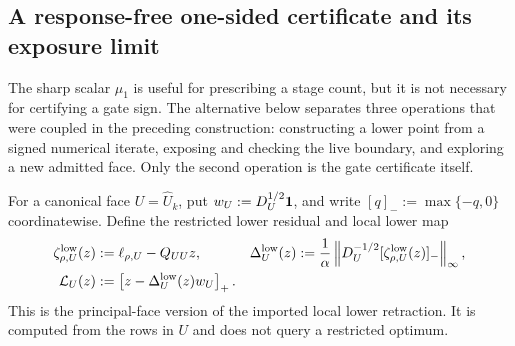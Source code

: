 \subsection{A response-free one-sided certificate and its exposure limit}
\label{sec:branch-caterpillar-first-layer-one-sided-splice}

The sharp scalar $\mu_1$ is useful for prescribing a stage count, but it is
not necessary for certifying a gate sign.  The alternative below separates
three operations that were coupled in the preceding construction:
constructing a lower point from a signed numerical iterate, exposing and
checking the live boundary, and exploring a new admitted face.  Only the
second operation is the gate certificate itself.

For a canonical face $U=\widehat U_k$, put
$w_U:=D_U^{1/2}\mathbf{1}$, and write $[q]_-:=\max\{-q,0\}$ coordinatewise.
Define the restricted lower residual and local lower map
\begin{align}
 \zeta_{\rho,U}^{\rm low}(z)
  &:=\ell_{\rho,U}-Q_{UU}z,
 &
 \Delta_U^{\rm low}(z)
  &:=\frac1\alpha
    \left\lVert D_U^{-1/2}
       [\zeta_{\rho,U}^{\rm low}(z)]_-\right\rVert_\infty,
 \notag\\
 \mathcal L_U(z)
  &:=\left[z-\Delta_U^{\rm low}(z)w_U\right]_+.
 \label{eq:branch-caterpillar-local-lower-map}
\end{align}
This is the principal-face version of the imported local lower retraction.
It is computed from the rows in $U$ and does not query a restricted optimum.

